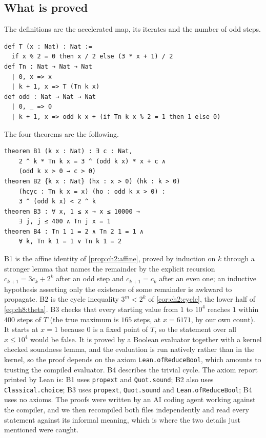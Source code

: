 
\subsection{What is proved}

The definitions are the accelerated map, its iterates and the number of odd
steps.

\begin{lstlisting}[style=ch8lean]
def T (x : Nat) : Nat :=
  if x % 2 = 0 then x / 2 else (3 * x + 1) / 2
def Tn : Nat → Nat → Nat
  | 0, x => x
  | k + 1, x => T (Tn k x)
def odd : Nat → Nat → Nat
  | 0, _ => 0
  | k + 1, x => odd k x + (if Tn k x % 2 = 1 then 1 else 0)
\end{lstlisting}

\noindent The four theorems are the following.

\begin{lstlisting}[style=ch8lean]
theorem B1 (k x : Nat) : ∃ c : Nat,
    2 ^ k * Tn k x = 3 ^ (odd k x) * x + c ∧
    (odd k x > 0 → c > 0)
theorem B2 {k x : Nat} (hx : x > 0) (hk : k > 0)
    (hcyc : Tn k x = x) (ho : odd k x > 0) :
    3 ^ (odd k x) < 2 ^ k
theorem B3 : ∀ x, 1 ≤ x → x ≤ 10000 →
    ∃ j, j ≤ 400 ∧ Tn j x = 1
theorem B4 : Tn 1 1 = 2 ∧ Tn 2 1 = 1 ∧
    ∀ k, Tn k 1 = 1 ∨ Tn k 1 = 2
\end{lstlisting}

B1 is the affine identity of \cref{prop:ch2:affine}, proved by induction on
$k$ through a stronger lemma that names the remainder by the explicit
recursion $c_{k+1}=3c_k+2^k$ after an odd step and $c_{k+1}=c_k$ after an even
one; an inductive hypothesis asserting only the existence of some remainder is
awkward to propagate. B2 is the cycle inequality $3^m<2^k$ of
\cref{cor:ch2:cycle}, the lower half of \eqref{eq:ch8:theta}. B3 checks that
every starting value from $1$ to $10^4$ reaches $1$ within $400$ steps of $T$
(the true maximum is $165$ steps, at $x=6171$, by our own count). It starts at
$x=1$ because $0$ is a fixed point of $T$, so the statement over all
$x\leq10^4$ would be false. It is proved by a Boolean evaluator together with
a kernel checked soundness lemma, and the evaluation is run natively rather
than in the kernel, so the proof depends on the axiom
\texttt{Lean.ofReduceBool}, which amounts to trusting the compiled evaluator.
B4 describes the trivial cycle. The axiom report printed by Lean is: B1 uses
\texttt{propext} and \texttt{Quot.sound}; B2 also uses
\texttt{Classical.choice}; B3 uses \texttt{propext}, \texttt{Quot.sound} and \texttt{Lean.ofReduceBool}; B4 uses no
axioms. The proofs were written by an AI coding agent working against the
compiler, and we then recompiled both files independently and read every
statement against its informal meaning, which is where the two details just
mentioned were caught.

